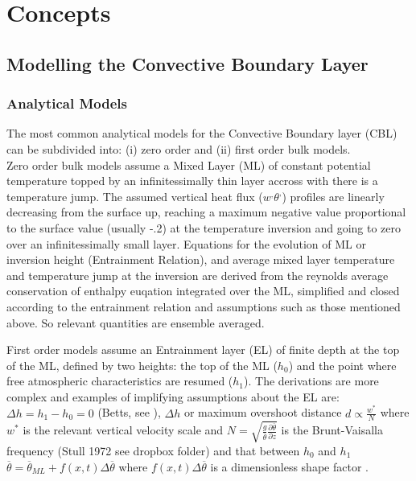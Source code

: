 
\chapter{Concepts}
\label{ch:Conceptss}
\setlength{\parindent}{0cm}

\section{Modelling the Convective Boundary Layer}
\label{CBLModels}

\subsection{Analytical Models}
The most common analytical models for the Convective Boundary layer (\acs{CBL}) can be subdivided into: (i) zero order
and (ii) first order bulk models.\\

Zero order bulk models assume a Mixed Layer (\acs{ML}) of constant potential temperature topped
by an infinitessimally thin layer accross with there is a temperature jump.  The assumed vertical heat flux ($w^{,}\theta^{,}$) profiles are
linearly decreasing from the surface up, reaching a maximum negative value proportional to the surface value (usually -.2)
at the temperature inversion and going to zero over an infinitessimally small layer.  Equations for the evolution of ML or inversion height (Entrainment Relation),
and average mixed layer temperature and temperature jump at the inversion are derived from the reynolds average conservation of enthalpy
euqation integrated over the ML, simplified and closed according to the entrainment relation and assumptions such as those mentioned above.  
So relevant quantities are ensemble averaged.\\

\cite{Deardorff79}

First order models assume an Entrainment layer (\acs{EL}) of finite depth at the top of the ML, defined by two heights:
the top of the ML ($h_{0}$) and the point where free atmospheric characteristics are resumed ($h_{1}$).  The derivations are more complex and 
examples of implifying assumptions about the \acs{EL} are: $\Delta h = h_{1} - h_{0} = 0$ (Betts, see \cite{Deardorff79}), $\Delta h$ or maximum 
overshoot distance $d \propto \frac{w^{*}}{N}$ where $w^{*}$ is the relevant vertical velocity scale and $N = \sqrt{\frac{g}{\overline{\theta}} \frac{\partial \overline{\theta}}{\partial z}}$
is the Brunt-Vaisalla frequency (Stull 1972 see dropbox folder) and that between $h_{0}$ and $h_{1}$ $\overline{\theta} = \overline{\theta}_{ML} + f(x,t) \Delta \overline{\theta}$ where
$f(x,t) \Delta \overline{\theta}$ is a dimensionless shape factor \cite{Deardorff79}.\\

